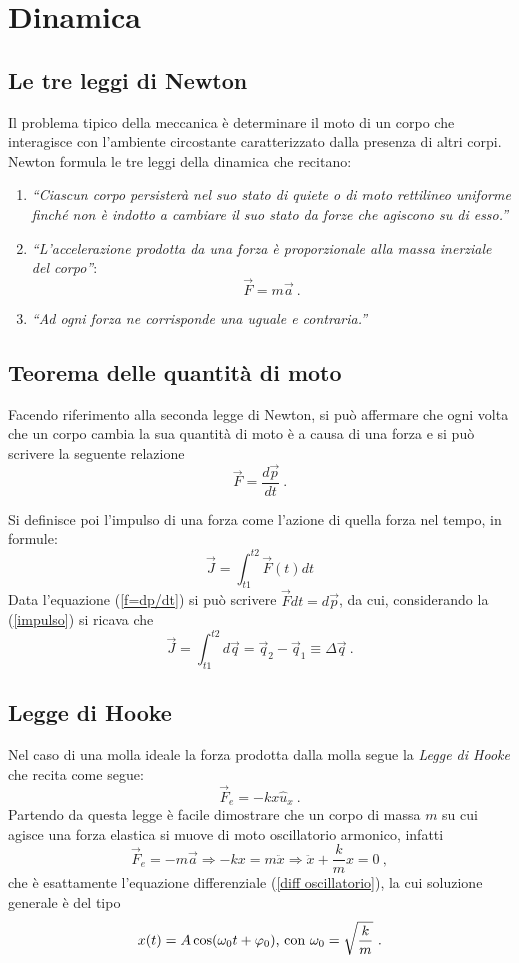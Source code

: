 \documentclass[12pt, oneside]{book}
\begin{document}


\chapter{Dinamica}
\section{Le tre leggi di Newton}
Il problema tipico della meccanica è determinare il moto di un corpo che interagisce con l'ambiente circostante caratterizzato dalla presenza di altri corpi. Newton formula le tre leggi della dinamica che recitano:
\begin{enumerate}
\item \textit{``Ciascun corpo persisterà nel suo stato di quiete o di moto rettilineo uniforme finché non è indotto a cambiare il suo stato da forze che agiscono su di esso.''}
\item \textit{``L'accelerazione prodotta da una forza è proporzionale alla massa inerziale del corpo''}:
\[\vec F = m\vec a~.\]
\item \textit{``Ad ogni forza ne corrisponde una uguale e contraria.''}
\end{enumerate}
\section{Teorema delle quantità di moto}
Facendo riferimento alla seconda legge di Newton, si può affermare che ogni volta che un corpo cambia la sua quantità di moto è a causa di una forza e si può scrivere la seguente relazione
\begin{equation}
\label{f=dp/dt}
\vec{F}=\dfrac{d\vec{p}}{dt}~.
\end{equation}

Si definisce poi l'impulso di una forza come l'azione di quella forza nel tempo, in formule:
\begin{equation}
\label{impulso}
\vec{J}=\int_{t1}^{t2}\vec{F}(t)dt
\end{equation}
Data l'equazione (\ref{f=dp/dt}) si può scrivere $\vec{F}dt=d\vec{p}$, da cui, considerando la (\ref{impulso}) si ricava che
\[\vec J =\int_{t1}^{t2} d\vec{q}=\vec{q}_2-\vec{q}_1\equiv\Delta\vec{q}~.\]

\section{Legge di Hooke}
Nel caso di una molla ideale la forza prodotta dalla molla segue la \textit{Legge di Hooke} che recita come segue:
\[\vec{F}_e=-kx\hat{u}_x~.\]
Partendo da questa legge è facile dimostrare che un corpo di massa $m$ su cui agisce una forza elastica si muove di moto oscillatorio armonico, infatti
\[\vec{F}_e=-m\vec a \Rightarrow -kx=m\ddot x\Rightarrow \ddot x + \dfrac{k}{m}x=0~,\]
che è esattamente l'equazione differenziale (\ref{diff oscillatorio}), la cui soluzione generale è del tipo
\[x(t)=A\cos (\omega_0 t + \varphi_0) \textnormal{, con } \omega_0 = \sqrt{\dfrac{k}{m}}~.\]
\end{document}
